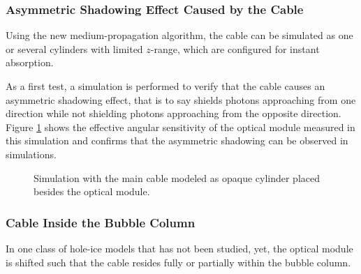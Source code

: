 \subsubsection{Asymmetric Shadowing Effect Caused by the Cable}

Using the new medium-propagation algorithm, the cable can be simulated as one or several cylinders with limited $z$-range, which are configured for instant absorption.

As a first test, a simulation is performed to verify that the cable causes an asymmetric shadowing effect, that is to say shields photons approaching from one direction while not shielding photons approaching from the opposite direction. Figure \ref{fig:ochoCh7o} shows the effective angular sensitivity of the optical module measured in this simulation and confirms that the asymmetric shadowing can be observed in simulations.


\begin{figure}[htbp]
  \hfill
  \caption{Simulation with the main cable modeled as opaque cylinder placed besides the optical module.}
  \label{fig:ochoCh7o}
\end{figure}


\subsubsection{Cable Inside the Bubble Column}


In one class of hole-ice models that has not been studied, yet, the optical module is shifted such that the cable resides fully or partially within the bubble column. \cite{martinspicehddard}

